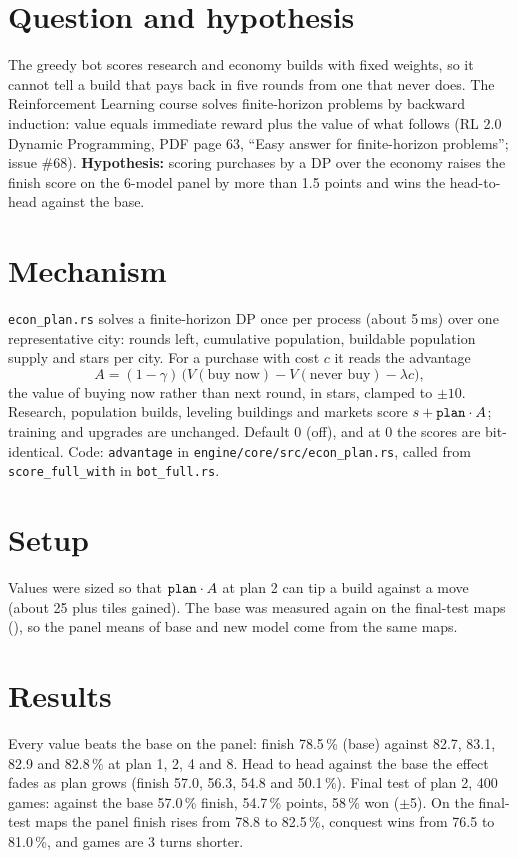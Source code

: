 \documentclass{../polyexp}
\begin{document}

\ExpHeader

\section{Question and hypothesis}
The greedy bot scores research and economy builds with fixed weights, so it cannot tell a build that pays back in five rounds from one that never does. The Reinforcement Learning course solves finite-horizon problems by backward induction: value equals immediate reward plus the value of what follows (RL 2.0 Dynamic Programming, PDF page 63, ``Easy answer for finite-horizon problems''; issue \#68). \textbf{Hypothesis:} scoring purchases by a DP over the economy raises the finish score on the 6-model panel by more than 1.5 points and wins the head-to-head against the base.

\section{Mechanism}
\texttt{econ\_plan.rs} solves a finite-horizon DP once per process (about 5\,ms) over one representative city: rounds left, cumulative population, buildable population supply and stars per city. For a purchase with cost $c$ it reads the advantage
\[
A = (1-\gamma)\,\bigl(V(\text{buy now}) - V(\text{never buy}) - \lambda c\bigr),
\]
the value of buying now rather than next round, in stars, clamped to $\pm 10$. Research, population builds, leveling buildings and markets score $s + \texttt{plan}\cdot A$; training and upgrades are unchanged. Default 0 (off), and at 0 the scores are bit-identical. Code: \texttt{advantage} in \texttt{engine/core/src/econ\_plan.rs}, called from \texttt{score\_full\_with} in \texttt{bot\_full.rs}.

\section{Setup}
Values were sized so that $\texttt{plan}\cdot A$ at plan 2 can tip a build against a move (about 25 plus tiles gained). The base was measured again on the final-test maps (), so the panel means of base and new model come from the same maps.

\section{Results}
\ExpResults

Every value beats the base on the panel: finish 78.5\,\% (base) against 82.7, 83.1, 82.9 and 82.8\,\% at plan 1, 2, 4 and 8. Head to head against the base the effect fades as plan grows (finish 57.0, 56.3, 54.8 and 50.1\,\%). Final test of plan 2, 400 games: against the base 57.0\,\% finish, 54.7\,\% points, 58\,\% won ($\pm$5). On the final-test maps the panel finish rises from 78.8 to 82.5\,\%, conquest wins from 76.5 to 81.0\,\%, and games are 3 turns shorter.
\end{document}
